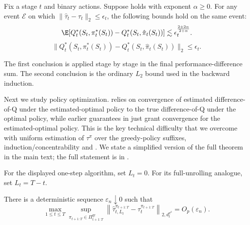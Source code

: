 \documentclass[opre,nonblindrev]{informs4}
\newcommand{\norm}[1]{\lVert#1\rVert}
\newcommand{\blipadv}{\tau}
\begin{document}
\begin{lemma}
\label{lemma-adverror-to-value}
Fix a stage $t$ and binary actions. Suppose  holds with
exponent $\alpha\geq0$. For any event $\mathcal E$ on which
$\norm{\hat\blipadv_t-\blipadv_t}_2\leq\epsilon_t$, the following bounds hold
on the same event:
\begin{equation*}
\E\!\left[
Q_t^*(S_t,\pi_t^*(S_t))-Q_t^*(S_t,\hat\pi_t(S_t))
\right]
\lesssim
\epsilon_t^{\frac{2+2\alpha}{2+\alpha}}.
\end{equation*}
\begin{equation*}
\norm{
Q_t^*(S_t,\pi_t^*(S_t))-Q_t^*(S_t,\hat\pi_t(S_t))
}_2
\leq\epsilon_t.
\end{equation*}
\end{lemma}
The first conclusion is applied stage by stage in the final
performance-difference sum. The second conclusion is the ordinary $L_2$
bound used in the backward induction.

Next we study policy optimization. { relies on convergence of estimated difference-of-Q under the estimated-optimal policy to the true difference-of-Q under the optimal policy, while earlier guarantees in  just grant convergence for the estimated-optimal policy. This is the key technical difficulty that we overcome with uniform estimation of $\blipadv^{\pi}$ over the greedy-policy suffixes,  induction/concentrability and . We state a simplified version of the full theorem in the main text; the full statement is in .}%

For the displayed one-step algorithm, set $L_t=0$. For its full-unrolling
analogue, set $L_t=T-t$.
\begin{assumption}
\label{asn-uniform-global}
There is a deterministic sequence $\varepsilon_n\downarrow0$ such that
\[
\max_{1\le t\le T}
\sup_{\pi_{t+1:T}\in\Pi_{t+1:T}^{\mathrm{gr}}}
\left\norm{
\hat\blipadv_{t,L_t}^{\pi_{t+1:T}}
-\blipadv_t^{\pi_{t+1:T}}
\right}_{2,d_t^{\pi^b}}
=O_p(\varepsilon_n).
\]
\end{assumption}
\end{document}
